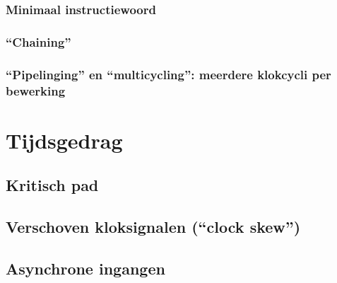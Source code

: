 \subsubsection{Minimaal instructiewoord}
\subsubsection{``Chaining''}
\subsubsection{``Pipelinging'' en ``multicycling'': meerdere klokcycli per bewerking}
\section{Tijdsgedrag}
\label{s:timeFSMD}
\subsection{Kritisch pad}
\subsection{Verschoven kloksignalen (``clock skew'')}
\subsection{Asynchrone ingangen}